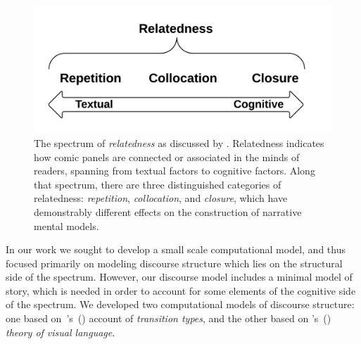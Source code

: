 %
\begin{figure}
	\includegraphics[width=\columnwidth]{relatedness.png}
	\caption{
		The spectrum of \emph{relatedness} as discussed by
		. Relatedness indicates how 
		comic panels are connected or associated in the minds of 
		readers, spanning from textual factors to cognitive factors. 
		Along that spectrum, there are three  distinguished 
		categories of relatedness: \emph{repetition}, 
		\emph{collocation}, and \emph{closure}, which have
		demonstrably different effects on the construction of
		narrative mental models.
		}
	\label{figure:relatedness}
\end{figure}
%



%


%
In our work we sought to develop a small scale computational model, and thus
focused primarily on modeling discourse structure which lies on the structural
side of the spectrum. However, our discourse model includes a minimal model of
story, which is needed in order to account for some elements of the cognitive
side of the spectrum.  We developed two computational models of discourse
structure: one based
on~\citeauthor{mcCloud1993understanding}'s~(\citeyear{mcCloud1993understanding})
account of \emph{transition types}, and the other based on
\citeauthor{cohn2013visual}'s~(\citeyear{cohn2013visual}) \emph{theory of visual
language}.



